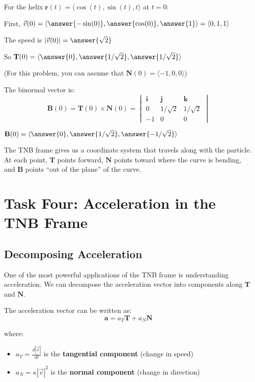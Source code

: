 \documentclass{ximera}
\begin{document}
\begin{problem}
For the helix $\mathbf{r}(t) = \langle \cos(t), \sin(t), t \rangle$ at $t = 0$:

First, $\vec{v}(0) = \langle \answer{-\sin(0)}, \answer{\cos(0)}, \answer{1} \rangle = \langle 0, 1, 1 \rangle$

The speed is $|\vec{v}(0)| = \answer{\sqrt{2}}$

So $\mathbf{T}(0) = \langle \answer{0}, \answer{1/\sqrt{2}}, \answer{1/\sqrt{2}} \rangle$

(For this problem, you can assume that $\mathbf{N}(0) = \langle -1, 0, 0 \rangle$)

The binormal vector is:
\[\mathbf{B}(0) = \mathbf{T}(0) \times \mathbf{N}(0) = \begin{vmatrix} \mathbf{i} & \mathbf{j} & \mathbf{k} \\ 0 & 1/\sqrt{2} & 1/\sqrt{2} \\ -1 & 0 & 0 \end{vmatrix}\]

$\mathbf{B}(0) = \langle \answer{0}, \answer{1/\sqrt{2}}, \answer{-1/\sqrt{2}} \rangle$

\begin{feedback}
The TNB frame gives us a coordinate system that travels along with the particle. At each point, $\mathbf{T}$ points forward, $\mathbf{N}$ points toward where the curve is bending, and $\mathbf{B}$ points ``out of the plane'' of the curve.
\end{feedback}
\end{problem}

\section*{Task Four: Acceleration in the TNB Frame}

\subsection*{Decomposing Acceleration}

One of the most powerful applications of the TNB frame is understanding acceleration. We can decompose the acceleration vector into components along $\mathbf{T}$ and $\mathbf{N}$.

\begin{definition}
The acceleration vector can be written as:
\[\mathbf{a} = a_T \mathbf{T} + a_N \mathbf{N}\]

where:
\begin{itemize}
    \item $a_T = \frac{d|\vec{v}|}{dt}$ is the \textbf{tangential component} (change in speed)
    \item $a_N = \kappa |\vec{v}|^2$ is the \textbf{normal component} (change in direction)
\end{itemize}
\end{definition}
\end{document}
